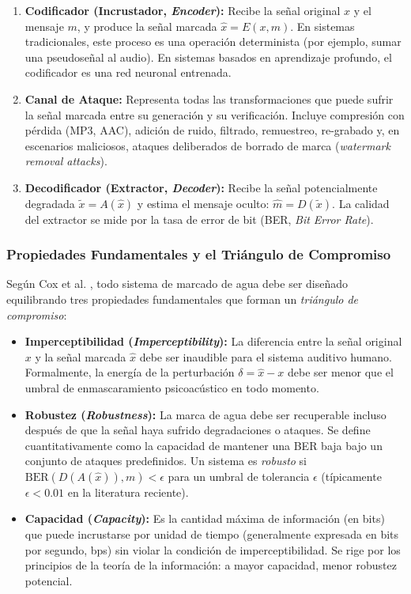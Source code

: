 \begin{enumerate}
    \item \textbf{Codificador (Incrustador, \textit{Encoder}):} Recibe la señal original $x$ y el mensaje $m$, y produce la señal marcada $\hat{x} = E(x, m)$. En sistemas tradicionales, este proceso es una operación determinista (por ejemplo, sumar una pseudoseñal al audio). En sistemas basados en aprendizaje profundo, el codificador es una red neuronal entrenada.

    \item \textbf{Canal de Ataque:} Representa todas las transformaciones que puede sufrir la señal marcada entre su generación y su verificación. Incluye compresión con pérdida (MP3, AAC), adición de ruido, filtrado, remuestreo, re-grabado y, en escenarios maliciosos, ataques deliberados de borrado de marca (\textit{watermark removal attacks}).

    \item \textbf{Decodificador (Extractor, \textit{Decoder}):} Recibe la señal potencialmente degradada $\tilde{x} = A(\hat{x})$ y estima el mensaje oculto: $\hat{m} = D(\tilde{x})$. La calidad del extractor se mide por la tasa de error de bit (BER, \textit{Bit Error Rate}).
\end{enumerate}

\subsubsection{Propiedades Fundamentales y el Triángulo de Compromiso}

Según Cox et al. \cite{cox2007digital}, todo sistema de marcado de agua debe ser diseñado equilibrando tres propiedades fundamentales que forman un \textit{triángulo de compromiso}:

\begin{itemize}
    \item \textbf{Imperceptibilidad (\textit{Imperceptibility}):} La diferencia entre la señal original $x$ y la señal marcada $\hat{x}$ debe ser inaudible para el sistema auditivo humano. Formalmente, la energía de la perturbación $\delta = \hat{x} - x$ debe ser menor que el umbral de enmascaramiento psicoacústico en todo momento.

    \item \textbf{Robustez (\textit{Robustness}):} La marca de agua debe ser recuperable incluso después de que la señal haya sufrido degradaciones o ataques. Se define cuantitativamente como la capacidad de mantener una BER baja bajo un conjunto de ataques predefinidos. Un sistema es \textit{robusto} si $\text{BER}(D(A(\hat{x})), m) < \epsilon$ para un umbral de tolerancia $\epsilon$ (típicamente $\epsilon < 0.01$ en la literatura reciente).

    \item \textbf{Capacidad (\textit{Capacity}):} Es la cantidad máxima de información (en bits) que puede incrustarse por unidad de tiempo (generalmente expresada en bits por segundo, bps) sin violar la condición de imperceptibilidad. Se rige por los principios de la teoría de la información: a mayor capacidad, menor robustez potencial.
\end{itemize}

